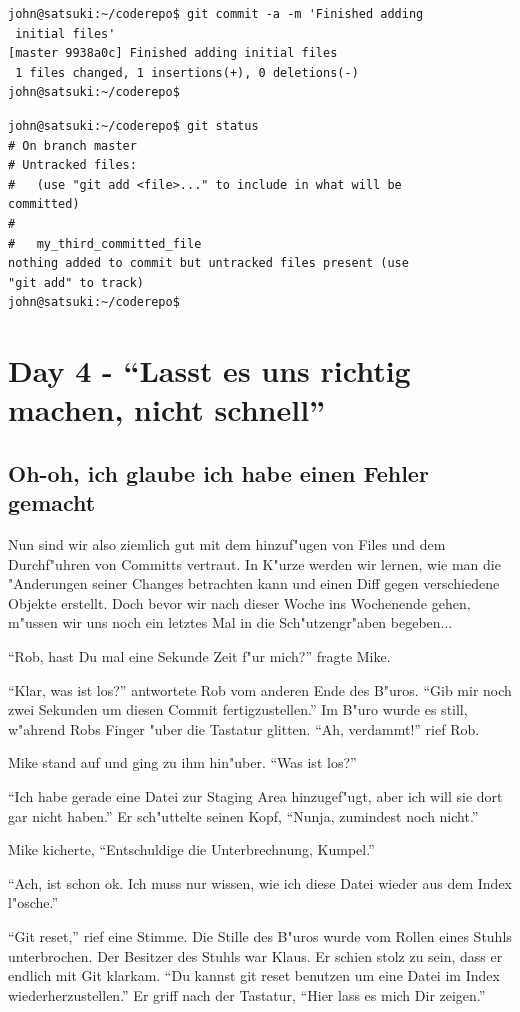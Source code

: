 \begin{Verbatim}
john@satsuki:~/coderepo$ git commit -a -m 'Finished adding 
 initial files'
[master 9938a0c] Finished adding initial files
 1 files changed, 1 insertions(+), 0 deletions(-)
john@satsuki:~/coderepo$ 
\end{Verbatim} 

\begin{Verbatim}
john@satsuki:~/coderepo$ git status
# On branch master
# Untracked files:
#   (use "git add <file>..." to include in what will be 
committed)
#
#	my_third_committed_file
nothing added to commit but untracked files present (use 
"git add" to track)
john@satsuki:~/coderepo$ 

\end{Verbatim} 

\section{Day 4 - ``Lasst es uns richtig machen, nicht schnell''}

\subsection{Oh-oh, ich glaube ich habe einen Fehler gemacht}

Nun sind wir also ziemlich gut mit dem hinzuf"ugen von Files und dem Durchf"uhren von Committs vertraut. In K"urze werden wir lernen, wie man die "Anderungen seiner Changes betrachten kann und einen Diff gegen verschiedene Objekte erstellt. Doch bevor wir nach dieser Woche ins Wochenende gehen, m"ussen wir uns noch ein letztes Mal in die Sch"utzengr"aben begeben...

\begin{trenches}
``Rob, hast Du mal eine Sekunde Zeit f"ur mich?'' fragte Mike.

``Klar, was ist los?'' antwortete Rob vom anderen Ende des B"uros. ``Gib mir noch zwei Sekunden um diesen Commit fertigzustellen.'' Im B"uro wurde es still,
w"ahrend Robs Finger "uber die Tastatur glitten. ``Ah, verdammt!'' rief Rob.

Mike stand auf und ging zu ihm hin"uber. ``Was ist los?''

``Ich habe gerade eine Datei zur Staging Area hinzugef"ugt, aber ich will sie dort gar nicht haben.'' Er sch"uttelte seinen Kopf, ``Nunja, zumindest noch nicht.''

Mike kicherte, ``Entschuldige die Unterbrechnung, Kumpel.''

``Ach, ist schon ok. Ich muss nur wissen, wie ich diese Datei wieder aus dem Index l"osche.''

``Git reset,'' rief eine Stimme. Die Stille des B"uros wurde vom Rollen eines Stuhls unterbrochen. Der Besitzer des Stuhls war Klaus. Er schien stolz zu sein, dass er endlich mit Git klarkam. ``Du kannst git reset benutzen um eine Datei im Index wiederherzustellen.'' Er griff nach der Tastatur, ``Hier lass es mich Dir zeigen.''
\end{trenches}

